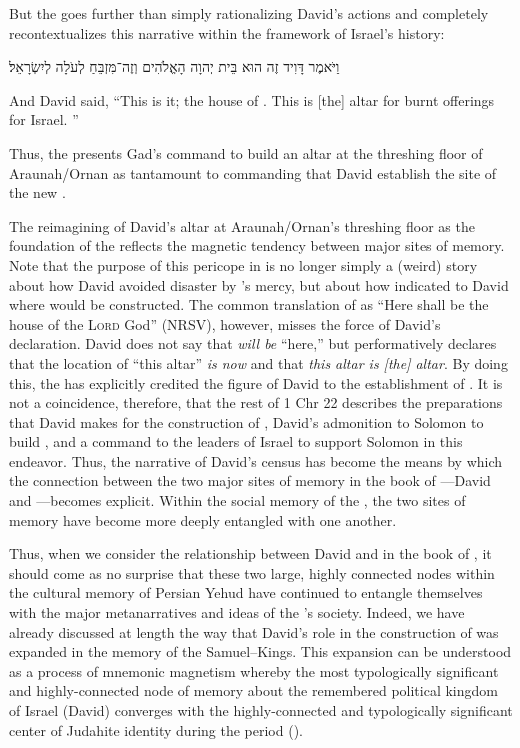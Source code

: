 But the \chronicler goes further than simply rationalizing David's actions and completely recontextualizes this narrative within the framework of Israel's history:
\begin{hebrewtext}
    וַיֹּאמֶר דָּוִיד זֶה הוּא בֵּית יְהוָה הָאֱלֹהִים וְזֶה־מִּזְבֵּחַ לְעֹלָה לְיִשְׂרָאֵל׃ 
\end{hebrewtext}
\begin{translation}
    And David said, ``This is it; the house of \yahweh. This is [the] altar for burnt offerings for Israel. ''
\end{translation}
\noindent
Thus, the \chronicler presents Gad's command to build an altar at the threshing floor of Araunah/Ornan as tantamount to commanding that David establish the site of the new \temple.  

The reimagining of David's altar at Araunah/Ornan's threshing floor as the foundation of the \jerusalemtemple reflects the magnetic tendency between major sites of memory. Note that the purpose of this pericope in \chronicles is no longer simply a (weird) story about how David avoided disaster by \yahweh's mercy, but about how \yahweh indicated to David where \thetemple would be constructed. The common translation of  as ``Here shall be the house of the \textsc{Lord} God'' (NRSV), however, misses the force of David's declaration. David does not say that \thetemple \emph{will be} ``here,'' but performatively declares that the location of ``this altar'' \emph{is now \thetemple} and that \emph{this altar is [the] altar}. By doing this, the \chronicler has explicitly credited the figure of David to the establishment of \solomonstemple. It is not a coincidence, therefore, that the rest of 1 Chr 22 describes the preparations that David makes for the construction of \thetemple, David's admonition to Solomon to build \thetemple, and a command to the leaders of Israel to support Solomon in this endeavor. Thus, the narrative of David's census has become the means by which the connection between the two major sites of memory in the book of \chronicles---David and \thetemple---becomes explicit. Within the social memory of the \chronicler, the two sites of memory have become more deeply entangled with one another. 

Thus, when we consider the relationship between David and \thetemple in the book of \chronicles, it should come as no surprise that these two large, highly connected nodes within the cultural memory of Persian Yehud have continued to entangle themselves with the major metanarratives and ideas of the \chronicler's society. Indeed, we have already discussed at length the way that David's role in the construction of \thetemple was expanded in the memory of the \chronicler \visavis Samuel--Kings. This expansion can be understood as a process of mnemonic magnetism whereby the most typologically significant and highly-connected node of memory about the remembered political kingdom of Israel (David) converges with the highly-connected and typologically significant center of Judahite identity during the \secondtemple period (\thetemple). 

